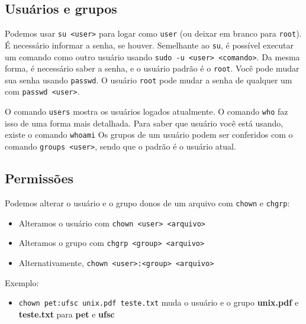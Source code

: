 \documentclass{beamer}
\begin{document}
\subsection{Usuários e grupos}

\begin{frame}

	Podemos usar \texttt{su <user>} para logar como \texttt{user} (ou deixar em
	branco para \texttt{root}). É necessário informar a senha, se houver.
	\newline
	\newline
	Semelhante ao \texttt{su}, é possível executar um comando como outro usuário
	usando \texttt{sudo -u <user> <comando>}. Da mesma forma, é necessário saber
	a senha, e o usuário padrão é o \texttt{root}.
	\newline
	\newline
	Você pode mudar sua senha usando \texttt{passwd}. O usuário \texttt{root}
	pode mudar a senha de qualquer um com \texttt{passwd <user>}.

\end{frame}

\begin{frame}

	O comando \texttt{users} mostra os usuários logados atualmente. O comando
	\texttt{who} faz isso de uma forma mais detalhada.
	\newline
	\newline
	Para saber que usuário você está usando, existe o comando \texttt{whoami}
	\newline
	\newline
	Os grupos de um usuário podem ser conferidos com o comando
	\texttt{groups <user>}, sendo que o padrão é o usuário atual.

\end{frame}

\subsection{Permissões}

\begin{frame}

	Podemos alterar o usuário e o grupo donos de um arquivo com \texttt{chown} e
	\texttt{chgrp}:
	\begin{itemize}
		\item Alteramos o usuário com \texttt{chown <user> <arquivo>}
		\item Alteramos o grupo com \texttt{chgrp <group> <arquivo>}
		\item Alternativamente, \texttt{chown <user>:<group> <arquivo>}
	\end{itemize}
	Exemplo:
	\begin{itemize}
		\item \texttt{chown pet:ufsc unix.pdf teste.txt} muda o usuário e o grupo
		\textbf{unix.pdf} e \textbf{teste.txt} para \textbf{pet} e \textbf{ufsc}
	\end{itemize}

\end{frame}
\end{document}
